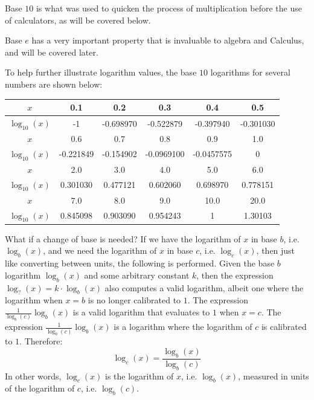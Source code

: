 \documentclass{article}
\begin{document}
Base \(10\) is what was used to quicken the process of multiplication before the use of calculators, as will be covered below. 

Base \(e\) has a very important property that is invaluable to algebra and Calculus, and will be covered later.

To help further illustrate logarithm values, the base \(10\) logarithms for several numbers are shown below:

\begin{tabular}{|c||c|c|c|c|c|}
\hline
\(x\) & 0.1 & 0.2 & 0.3 & 0.4 & 0.5 \\
\hline
\(\log_{10}(x)\) & -1 & -0.698970 & -0.522879 & -0.397940 & -0.301030 \\
\hline
\hline
\(x\) & 0.6 & 0.7 & 0.8 & 0.9 & 1.0 \\
\hline
\(\log_{10}(x)\) & -0.221849 & -0.154902 & -0.0969100 & -0.0457575 & 0 \\
\hline
\hline
\(x\) & 2.0 & 3.0 & 4.0 & 5.0 & 6.0 \\
\hline
\(\log_{10}(x)\) & 0.301030 & 0.477121 & 0.602060 & 0.698970 & 0.778151 \\
\hline
\hline
\(x\) & 7.0 & 8.0 & 9.0 & 10.0 & 20.0 \\
\hline
\(\log_{10}(x)\) & 0.845098 & 0.903090 & 0.954243 & 1 & 1.30103 \\
\hline
\end{tabular}

\vspace{5mm}

What if a change of base is needed? If we have the logarithm of \(x\) in base \(b\), i.e. \(\log_b(x)\), and we need the logarithm of \(x\) in base \(c\), i.e. \(\log_c(x)\), then just like converting between units, the following is performed. Given the base \(b\) logarithm \(\log_b(x)\) and some arbitrary constant \(k\), then the expression \(\log_?(x) = k \cdot \log_b(x)\) also computes a valid logarithm, albeit one where the logarithm when \(x = b\) is no longer calibrated to \(1\). The expression \(\frac{1}{\log_b(c)} \log_b(x)\) is a valid logarithm that evaluates to \(1\) when \(x = c\). The expression \(\frac{1}{\log_b(c)} \log_b(x)\) is a logarithm where the logarithm of \(c\) is calibrated to \(1\). Therefore:
\[\log_c(x) = \frac{\log_b(x)}{\log_b(c)}\]   
In other words, \(\log_c(x)\) is the logarithm of \(x\), i.e. \(\log_b(x)\), measured in units of the logarithm of \(c\), i.e. \(\log_b(c)\).
\end{document}
